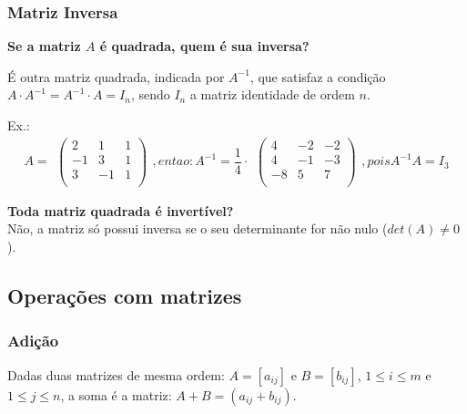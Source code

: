 \documentclass[12pt]{article}
\begin{document}
\subsubsection{Matriz Inversa}
\textbf{Se a matriz $A$ é quadrada, quem é sua inversa?}

\noindent
É outra matriz quadrada, indicada por $A^{-1}$, que satisfaz a condição $A \cdot A^{-1} = A^{-1} \cdot A = I_n$, sendo $I_n$ a matriz identidade de ordem $n$.

Ex.: \[
A =
    \begin{array}{c}
        \begin{pmatrix}
            2  &  1  &  1 \\
           -1  &  3  &  1 \\
            3  & -1  &  1 \\
        \end{pmatrix}
    \end{array}
, entao:
A^{-1} =
    \frac{1}{4} \cdot
    \begin{array}{c}
        \begin{pmatrix}
            4  & -2  & -2 \\
            4  & -1  & -3 \\
           -8  &  5  &  7 \\
        \end{pmatrix}
    \end{array}
    , pois A^{-1}A=I_3 
\]

\noindent
\textbf{Toda matriz quadrada é invertível?} \\
Não, a matriz só possui inversa se o seu determinante for não nulo ($det(A) \neq 0$).

\subsection{Operações com matrizes}
\subsubsection{Adição}
Dadas duas matrizes de mesma ordem: $A=[a_{ij}] \text{ e } B=[b_{ij}]$, $1 \leq i \leq m$ e $1 \leq j \leq n$, a soma é a matriz: $A+B=(a_{ij}+b_{ij})$.
\end{document}
